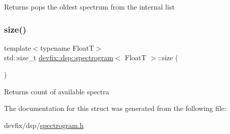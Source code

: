 \begin{DoxyReturn}{Returns}
pops the oldest spectrum from the internal list 
\end{DoxyReturn}
\mbox{\label{structdevfix_1_1dsp_1_1spectrogram_aa9ac5beddc07be29082a1ef11ff2392b}} 
\subsubsection{\texorpdfstring{size()}{size()}}
{\footnotesize\ttfamily template$<$typename FloatT$>$ \\
std\+::size\+\_\+t \hyperlink{structdevfix_1_1dsp_1_1spectrogram}{devfix\+::dsp\+::spectrogram}$<$ FloatT $>$\+::size (\begin{DoxyParamCaption}{ }\end{DoxyParamCaption})\hspace{0.3cm}{\ttfamily [inline]}}

\begin{DoxyReturn}{Returns}
count of available spectra 
\end{DoxyReturn}


The documentation for this struct was generated from the following file\+:\begin{DoxyCompactItemize}
\item 
devfix/dsp/\hyperlink{spectrogram_8h}{spectrogram.\+h}\end{DoxyCompactItemize}
